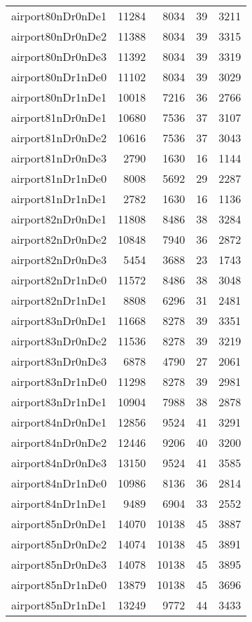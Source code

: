 \begin{longtable}{lrrrr}
airport80nDr0nDe1 & 11284 & 8034 & 39 & 3211 \\
airport80nDr0nDe2 & 11388 & 8034 & 39 & 3315 \\
airport80nDr0nDe3 & 11392 & 8034 & 39 & 3319 \\
airport80nDr1nDe0 & 11102 & 8034 & 39 & 3029 \\
airport80nDr1nDe1 & 10018 & 7216 & 36 & 2766 \\
airport81nDr0nDe1 & 10680 & 7536 & 37 & 3107 \\
airport81nDr0nDe2 & 10616 & 7536 & 37 & 3043 \\
airport81nDr0nDe3 & 2790 & 1630 & 16 & 1144 \\
airport81nDr1nDe0 & 8008 & 5692 & 29 & 2287 \\
airport81nDr1nDe1 & 2782 & 1630 & 16 & 1136 \\
airport82nDr0nDe1 & 11808 & 8486 & 38 & 3284 \\
airport82nDr0nDe2 & 10848 & 7940 & 36 & 2872 \\
airport82nDr0nDe3 & 5454 & 3688 & 23 & 1743 \\
airport82nDr1nDe0 & 11572 & 8486 & 38 & 3048 \\
airport82nDr1nDe1 & 8808 & 6296 & 31 & 2481 \\
airport83nDr0nDe1 & 11668 & 8278 & 39 & 3351 \\
airport83nDr0nDe2 & 11536 & 8278 & 39 & 3219 \\
airport83nDr0nDe3 & 6878 & 4790 & 27 & 2061 \\
airport83nDr1nDe0 & 11298 & 8278 & 39 & 2981 \\
airport83nDr1nDe1 & 10904 & 7988 & 38 & 2878 \\
airport84nDr0nDe1 & 12856 & 9524 & 41 & 3291 \\
airport84nDr0nDe2 & 12446 & 9206 & 40 & 3200 \\
airport84nDr0nDe3 & 13150 & 9524 & 41 & 3585 \\
airport84nDr1nDe0 & 10986 & 8136 & 36 & 2814 \\
airport84nDr1nDe1 & 9489 & 6904 & 33 & 2552 \\
airport85nDr0nDe1 & 14070 & 10138 & 45 & 3887 \\
airport85nDr0nDe2 & 14074 & 10138 & 45 & 3891 \\
airport85nDr0nDe3 & 14078 & 10138 & 45 & 3895 \\
airport85nDr1nDe0 & 13879 & 10138 & 45 & 3696 \\
airport85nDr1nDe1 & 13249 & 9772 & 44 & 3433 \\

\end{longtable}
